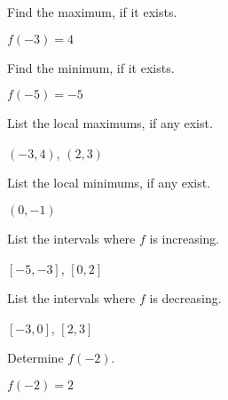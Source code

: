 \documentclass{ximera}
\begin{document}
\begin{question}
Find the maximum, if it exists.
\begin{solution}
$f(-3) = 4$


\end{solution}

\end{question}

\begin{question}
Find the minimum, if it exists. 

\begin{solution}
$f(-5) = -5$
\end{solution}

\end{question}

\begin{question}
List the local maximums, if any exist.
\begin{solution}
$(-3,4)$,  $(2,3)$
\end{solution}

\end{question}

\begin{question}
List the local minimums, if any exist.

\begin{solution}
$(0,-1)$

\end{solution}

\end{question}

\begin{question}
List the intervals where $f$ is increasing.
\begin{solution}
$[-5,-3]$, $[0,2]$
\end{solution}

\end{question}

\begin{question}
List the intervals where $f$ is decreasing.

\begin{solution}
$[-3,0]$, $[2,3]$
\end{solution}

\end{question}

\begin{question}
Determine $f(-2)$.
\begin{solution}
$f(-2) = 2$


\end{solution}

\end{question}
\end{document}
